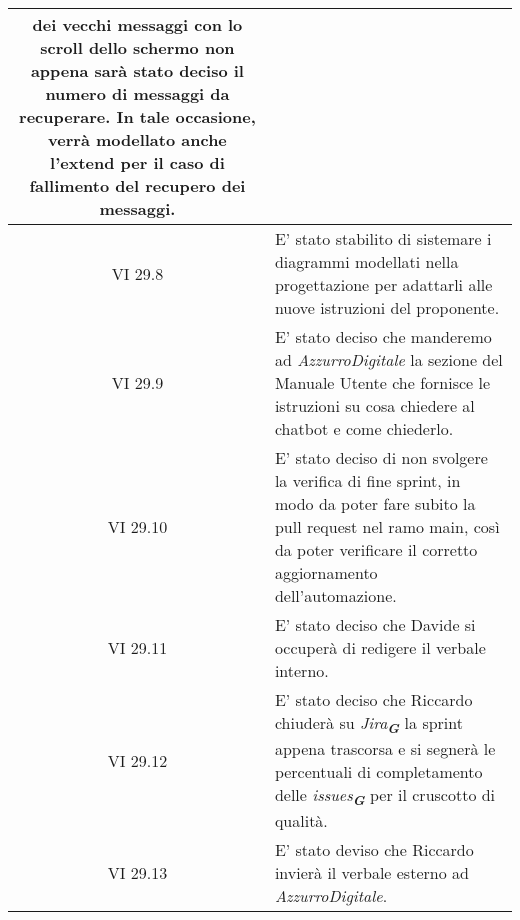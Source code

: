 \begin{table}[htbp]
\begin{tabular}{|c|p{}|}
        dei vecchi messaggi con lo scroll dello schermo non appena sarà stato deciso il numero di messaggi da recuperare. In tale
        occasione, verrà modellato anche l'extend per il caso di fallimento del recupero dei messaggi.\\ 
        \hline
        VI 29.8 & E' stato stabilito di sistemare i diagrammi modellati nella progettazione per adattarli alle nuove istruzioni del
        proponente.\\ 
        \hline
        VI 29.9 & E' stato deciso che manderemo ad \emph{AzzurroDigitale} la sezione del Manuale Utente che fornisce le istruzioni su
        cosa chiedere al chatbot e come chiederlo.\\ 
        \hline
        VI 29.10 & E' stato deciso di non svolgere la verifica di fine sprint, in modo da poter fare subito la pull request nel ramo
        main, così da poter verificare il corretto aggiornamento dell'automazione.\\ 
        \hline
        VI 29.11 & E' stato deciso che Davide si occuperà di redigere il verbale interno.\\ 
        \hline
        VI 29.12 & E' stato deciso che Riccardo chiuderà su \emph{Jira}\textsubscript{\textbf{\textit{G}}} la sprint appena trascorsa
        e si segnerà le percentuali di completamento delle \emph{issues}\textsubscript{\textbf{\textit{G}}} per il cruscotto di
        qualità.\\ 
        \hline
        VI 29.13 & E' stato deviso che Riccardo invierà il verbale esterno ad \emph{AzzurroDigitale}.\\ 
        \hline
    \end{tabular}
\end{table}